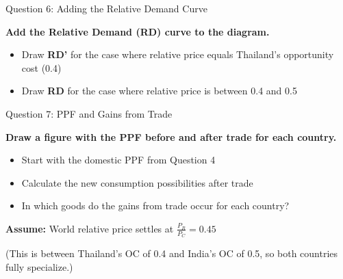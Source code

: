 \documentclass{beamer}
\begin{document}

\begin{frame}{Question 6: Adding the Relative Demand Curve}

\textbf{Add the Relative Demand (RD) curve to the diagram.}

\vspace{0.3cm}

\begin{itemize}
    \item Draw \textbf{RD'} for the case where relative price equals Thailand's opportunity cost (0.4)
    \item Draw \textbf{RD} for the case where relative price is between 0.4 and 0.5
\end{itemize}

\end{frame}



\begin{frame}{Question 7: PPF and Gains from Trade}

\textbf{Draw a figure with the PPF before and after trade for each country.}

\vspace{0.3cm}

\begin{itemize}
    \item Start with the domestic PPF from Question 4
    \item Calculate the new consumption possibilities after trade
    \item In which goods do the gains from trade occur for each country?
\end{itemize}

\vspace{0.5cm}

\textbf{Assume:} World relative price settles at $\frac{P_R}{P_C} = 0.45$ 

\vspace{0.2cm}

\small{(This is between Thailand's OC of 0.4 and India's OC of 0.5, so both countries fully specialize.)}

\end{frame}


\end{document}
